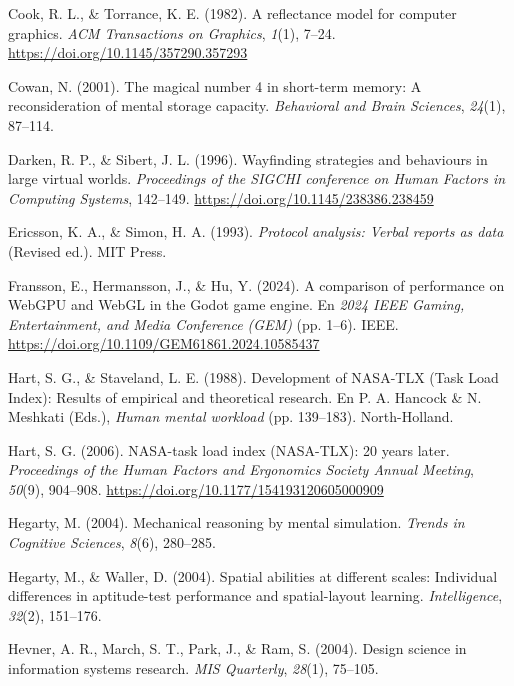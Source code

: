 \begin{list}{}
\item Cook, R. L., \& Torrance, K. E. (1982). A reflectance model for computer graphics. \textit{ACM Transactions on Graphics}, \textit{1}(1), 7--24. \url{https://doi.org/10.1145/357290.357293}

\item Cowan, N. (2001). The magical number 4 in short-term memory: A reconsideration of mental storage capacity. \textit{Behavioral and Brain Sciences}, \textit{24}(1), 87--114.

\item Darken, R. P., \& Sibert, J. L. (1996). Wayfinding strategies and behaviours in large virtual worlds. \textit{Proceedings of the SIGCHI conference on Human Factors in Computing Systems}, 142--149. \url{https://doi.org/10.1145/238386.238459}

\item Ericsson, K. A., \& Simon, H. A. (1993). \textit{Protocol analysis: Verbal reports as data} (Revised ed.). MIT Press.

\item Fransson, E., Hermansson, J., \& Hu, Y. (2024). A comparison of performance on WebGPU and WebGL in the Godot game engine. En \textit{2024 IEEE Gaming, Entertainment, and Media Conference (GEM)} (pp. 1--6). IEEE. \url{https://doi.org/10.1109/GEM61861.2024.10585437}

\item Hart, S. G., \& Staveland, L. E. (1988). Development of NASA-TLX (Task Load Index): Results of empirical and theoretical research. En P. A. Hancock \& N. Meshkati (Eds.), \textit{Human mental workload} (pp. 139--183). North-Holland.

\item Hart, S. G. (2006). NASA-task load index (NASA-TLX): 20 years later. \textit{Proceedings of the Human Factors and Ergonomics Society Annual Meeting}, \textit{50}(9), 904--908. \url{https://doi.org/10.1177/154193120605000909}

\item Hegarty, M. (2004). Mechanical reasoning by mental simulation. \textit{Trends in Cognitive Sciences}, \textit{8}(6), 280--285.

\item Hegarty, M., \& Waller, D. (2004). Spatial abilities at different scales: Individual differences in aptitude-test performance and spatial-layout learning. \textit{Intelligence}, \textit{32}(2), 151--176.

\item Hevner, A. R., March, S. T., Park, J., \& Ram, S. (2004). Design science in information systems research. \textit{MIS Quarterly}, \textit{28}(1), 75--105.


\end{list}
